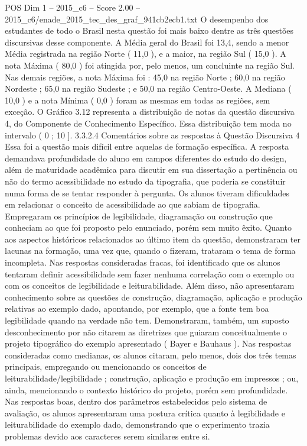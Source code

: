 \begin{textsample}{POS Dim 1 – 2015\_c6 – Score 2.00 – 2015\_c6/enade\_2015\_tec\_des\_graf\_941cb2ecb1.txt}
O desempenho dos estudantes de todo o Brasil nesta questão foi mais baixo dentre as três questões discursivas desse componente.
A Média geral do Brasil foi 13,4, sendo a menor Média registrada na região Norte ( 11,0 ), e a maior, na região Sul ( 15,0 ).
A nota Máxima ( 80,0 ) foi atingida por, pelo menos, um concluinte na região Sul.
Nas demais regiões, a nota Máxima foi : 45,0 na região Norte ; 60,0 na região Nordeste ; 65,0 na região Sudeste ; e 50,0 na região Centro-Oeste.
A Mediana ( 10,0 ) e a nota Mínima ( 0,0 ) foram as mesmas em todas as regiões, sem exceção.
O Gráfico 3.12 representa a distribuição de notas da questão discursiva 4, do Componente de Conhecimento Específico.
Essa distribuição tem moda no intervalo ( 0 ; 10 ]. 3.3.2.4 Comentários sobre as respostas à Questão Discursiva 4 Essa foi a questão mais difícil entre aquelas de formação específica.
A resposta demandava profundidade do aluno em campos diferentes do estudo do design, além de maturidade acadêmica para discutir em sua dissertação a pertinência ou não do termo acessibilidade no estudo da tipografia, que poderia se constituir numa forma de se tentar responder à pergunta.
Os alunos tiveram dificuldades em relacionar o conceito de acessibilidade ao que sabiam de tipografia.
Empregaram os princípios de legibilidade, diagramação ou construção que conheciam ao que foi proposto pelo enunciado, porém sem muito êxito.
Quanto aos aspectos históricos relacionados ao último item da questão, demonstraram ter lacunas na formação, uma vez que, quando o fizeram, trataram o tema de forma incompleta.
Nas respostas consideradas fracas, foi identificado que os alunos tentaram definir acessibilidade sem fazer nenhuma correlação com o exemplo ou com os conceitos de legibilidade e leiturabilidade.
Além disso, não apresentaram conhecimento sobre as questões de construção, diagramação, aplicação e produção relativas ao exemplo dado, apontando, por exemplo, que a fonte tem boa legibilidade quando na verdade não tem.
Demonstraram, também, um suposto desconhecimento por não citarem as diretrizes que guiaram conceitualmente o projeto tipográfico do exemplo apresentado ( Bayer e Bauhaus ).
Nas respostas consideradas como medianas, os alunos citaram, pelo menos, dois dos três temas principais, empregando ou mencionando os conceitos de leiturabilidade/legibilidade ; construção, aplicação e produção em impressos ; ou, ainda, mencionando o contexto histórico do projeto, porém sem profundidade.
Nas respostas boas, dentro dos parâmetros estabelecidos pelo sistema de avaliação, os alunos apresentaram uma postura crítica quanto à legibilidade e leiturabilidade do exemplo dado, demonstrando que o experimento trazia problemas devido aos caracteres serem similares entre si.

\end{textsample}
